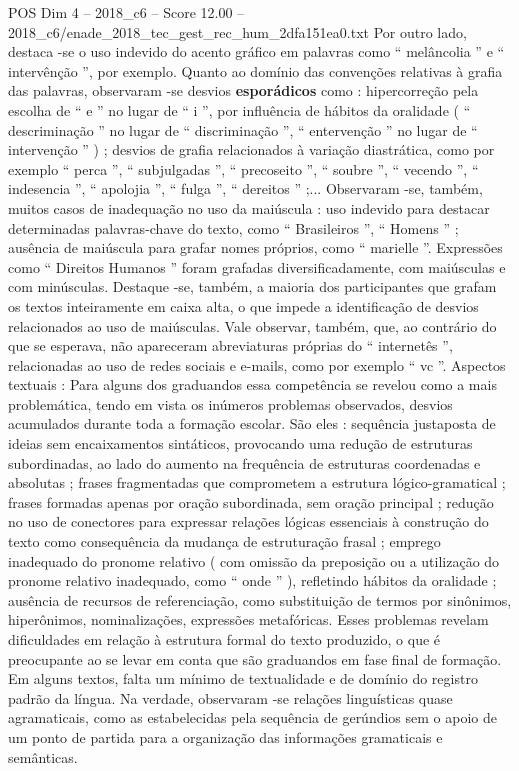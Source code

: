 \begin{textsample}{POS Dim 4 – 2018\_c6 – Score 12.00 – 2018\_c6/enade\_2018\_tec\_gest\_rec\_hum\_2dfa151ea0.txt}
Por outro lado, destaca -se o uso indevido do acento gráfico em palavras como “ melâncolia ” e “ intervênção ”, por exemplo.
Quanto ao domínio das convenções relativas à grafia das palavras, observaram -se desvios \textbf{esporádicos} como : hipercorreção pela escolha de “ e ” no lugar de “ i ”, por influência de hábitos da oralidade ( “ descriminação ” no lugar de “ discriminação ”, “ entervenção ” no lugar de “ intervenção ” ) ; desvios de grafia relacionados à variação diastrática, como por exemplo “ perca ”, “ subjulgadas ”, “ precoseito ”, “ soubre ”, “ vecendo ”, “ indesencia ”, “ apolojia ”, “ fulga ”, “ dereitos ” ;...
Observaram -se, também, muitos casos de inadequação no uso da maiúscula : uso indevido para destacar determinadas palavras-chave do texto, como “ Brasileiros ”, “ Homens ” ; ausência de maiúscula para grafar nomes próprios, como “ marielle ”.
Expressões como “ Direitos Humanos ” foram grafadas diversificadamente, com maiúsculas e com minúsculas.
Destaque -se, também, a maioria dos participantes que grafam os textos inteiramente em caixa alta, o que impede a identificação de desvios relacionados ao uso de maiúsculas.
Vale observar, também, que, ao contrário do que se esperava, não apareceram abreviaturas próprias do “ internetês ”, relacionadas ao uso de redes sociais e e-mails, como por exemplo “ vc ”.
Aspectos textuais : Para alguns dos graduandos essa competência se revelou como a mais problemática, tendo em vista os inúmeros problemas observados, desvios acumulados durante toda a formação escolar.
São eles : sequência justaposta de ideias sem encaixamentos sintáticos, provocando uma redução de estruturas subordinadas, ao lado do aumento na frequência de estruturas coordenadas e absolutas ; frases fragmentadas que comprometem a estrutura lógico-gramatical ; frases formadas apenas por oração subordinada, sem oração principal ; redução no uso de conectores para expressar relações lógicas essenciais à construção do texto como consequência da mudança de estruturação frasal ; emprego inadequado do pronome relativo ( com omissão da preposição ou a utilização do pronome relativo inadequado, como “ onde ” ), refletindo hábitos da oralidade ; ausência de recursos de referenciação, como substituição de termos por sinônimos, hiperônimos, nominalizações, expressões metafóricas.
Esses problemas revelam dificuldades em relação à estrutura formal do texto produzido, o que é preocupante ao se levar em conta que são graduandos em fase final de formação.
Em alguns textos, falta um mínimo de textualidade e de domínio do registro padrão da língua.
Na verdade, observaram -se relações linguísticas quase agramaticais, como as estabelecidas pela sequência de gerúndios sem o apoio de um ponto de partida para a organização das informações gramaticais e semânticas.

\end{textsample}

